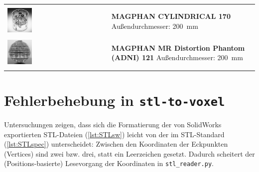 \begin{table}[H]
\begin{tabularx}{\textwidth}{l X}
		&\\
		\includegraphics[width=0.25\textwidth,valign=t]{img/phantoms/Magphan.jpg} & \textbf{MAGPHAN CYLINDRICAL 170} \newline Außendurchmesser: \SI{200}{\mm} \newline \cite{mag170}  \\
		&\\
		\includegraphics[width=0.25\textwidth,valign=t]{img/phantoms/magphan121.jpg} & \textbf{MAGPHAN MR Distortion Phantom (ADNI) 121} \newline Außendurchmesser: \SI{200}{\mm} \newline \cite{mag121} \\
		&\\
		\bottomrule
		\end{tabularx}
		\label{tab:phantomsOverview}
\end{table}
		
\section{Fehlerbehebung in \texttt{stl-to-voxel}}
\label{sec:stlToVoxFix}
Untersuchungen zeigen, dass sich die Formatierung der von SolidWorks exportierten STL-Dateien (\autoref{lst:STLsw}) leicht von der im STL-Standard (\autoref{lst:STLspec}) unterscheidet: Zwischen den Koordinaten der Eckpunkten (Vertices) sind  zwei bzw. drei, statt ein Leerzeichen gesetzt. Dadurch scheitert der (Positions-basierte) Lesevorgang der Koordinaten in \texttt{stl\_reader.py}.


